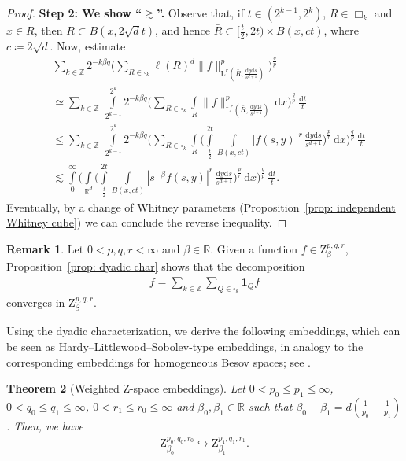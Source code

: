 \documentclass[11pt, leqno,parskip=half]{amsart}
\newtheorem{theorem}{Theorem}[section]
\theoremstyle{definition}
\newtheorem{remark}[theorem]{Remark}
\newcommand{\IR}{\mathbb{R}}
\newcommand{\IZ}{\mathbb{Z}}
\renewcommand{\L}{\mathrm{L}}
\newcommand{\Z}{\mathrm{Z}}
\renewcommand{\d}{\mathrm{d}}
\numberwithin{equation}{section}
\begin{document}
\begin{proof}
    \noindent\textbf{Step 2: We show \enquote{$\gtrsim$}.} Observe that, if $t \in (2^{k-1}, 2^k)$, $R \in \Box_k$ and $x\in R$, then $R \subset B(x,2\sqrt{d}t)$, and hence $\bar{R} \subset [\tfrac{t}{2},2t) \times B(x,ct)$, where $c \coloneqq 2\sqrt{d}$.
    Now, estimate
    \begin{align*}
        &\sum\limits_{k\in \IZ}2^{-k\beta q}\bigg( \sum\limits_{R\in \square_k}  \ell(R)^d \|f\|_{\L^r(\bar R , \frac{\d y \d s}{s^{d+1}})}^p \bigg)^\frac{q}{p}\\
        &\simeq \sum\limits_{k\in \IZ} \, \int\limits_{2^{k-1}}^{2^k} 2^{-k\beta q}\bigg( \sum\limits_{R\in \square_k}  \int\limits_R \|f\|_{\L^r(\bar R , \frac{\d y \d s}{s^{d+1}})}^p \,\d x \bigg)^\frac{q}{p}\,\frac{\d t}{t}\\
        &\leq \sum\limits_{k\in \IZ} \, \int\limits_{2^{k-1}}^{2^k} 2^{-k\beta q}\bigg( \sum\limits_{R\in \square_k} \int\limits_R \bigg( \int\limits_{\frac{t}{2}}^{2t}\int\limits_{B(x,ct)} |f(s,y)|^r \, \frac{\d y \d s}{s^{d+1}} \bigg)^\frac{p}{r} \,\d x \bigg)^\frac{q}{p}\,\frac{\d t}{t}\\
        &\lesssim \int\limits_{0}^\infty \bigg( \int\limits_{\IR^d}\bigg( \int\limits_{\frac{t}{2}}^{2t}\int\limits_{B(x,ct)} |s^{-\beta}f(s,y)|^r \, \frac{\d y \d s}{s^{d+1}} \bigg)^\frac{p}{r} \,\d x \bigg)^\frac{q}{p}\,\frac{\d t}{t}.
    \end{align*}
    Eventually, by a change of Whitney parameters (Proposition~\ref{prop: independent Whitney cube}) we can
    conclude the reverse inequality.
\end{proof}

\begin{remark}
\label{rem: trivial dyadic decomp}
    Let $0<p,q,r< \infty$ and $\beta\in\IR$. Given a function $f\in \Z^{p,q,r}_\beta$, Proposition~\ref{prop: dyadic char} shows that the decomposition
    \begin{align*}
        f = \sum\limits_{k\in\IZ} \sum\limits_{Q\in\square_k} \mathbf{1}_{\bar Q}f
    \end{align*}
    converges in $\Z^{p,q,r}_\beta$.
\end{remark}

Using the dyadic characterization, we derive the following embeddings, which can be seen as Hardy--Littlewood--Sobolev-type embeddings, in analogy to the corresponding embeddings for homogeneous Besov spaces; see \cite[Theorem 2.7.1]{Triebel1}.

\begin{theorem}[Weighted $\Z$-space embeddings]
\label{thm: weigthed embedding}
    Let $0<p_0\leq p_1\leq \infty$, $0<q_0\leq q_1\leq \infty$,  $0<r_1\leq r_0\leq \infty$ and $\beta_0,\beta_1\in \IR$ such that $\beta_0-\beta_1 = d(\frac{1}{p_0}-\frac{1}{p_1})$. Then, we have
    \begin{align*}
        \Z^{p_0,q_0,r_0}_{\beta_0} \hookrightarrow \Z^{p_1,q_1,r_1}_{\beta_1}.
    \end{align*}
\end{theorem}
\end{document}
